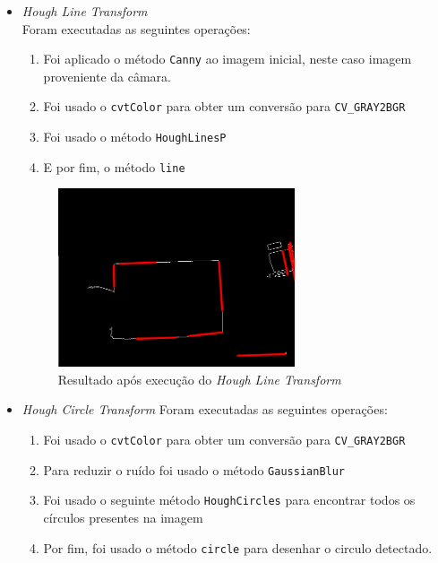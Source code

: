 \documentclass[portuguese, times, mirror]{revdetua}
\begin{document}
\begin{itemize}
    \item \textit{Hough Line Transform}\\
    Foram executadas as seguintes operações: 
    \begin{enumerate}
        \item Foi aplicado o método \texttt{Canny} ao imagem inicial, neste caso imagem proveniente da câmara. 
        \item Foi usado o \texttt{cvtColor} para obter um conversão para \texttt{CV\_GRAY2BGR}
        \item Foi usado o método \texttt{HoughLinesP}
        \item E por fim, o método \texttt{line}
    \end{enumerate}
    
\begin{figure}[ht!]
\centering
\includegraphics[width=70mm]{img/ex6_1.png}
\caption{Resultado após execução do \textit{Hough Line Transform}}
\end{figure}

    \newpage
    
    \item \textit{Hough Circle Transform}
    Foram executadas as seguintes operações: 
    \begin{enumerate}
        \item Foi usado o \texttt{cvtColor} para obter um conversão para \texttt{CV\_GRAY2BGR}
        \item Para reduzir o ruído foi usado o método \texttt{GaussianBlur}
        \item Foi usado o seguinte método \texttt{HoughCircles} para encontrar todos os círculos presentes na imagem
        \item Por fim, foi usado o método \texttt{circle} para desenhar o circulo detectado. 
    \end{enumerate}


\end{itemize}
\end{document}

